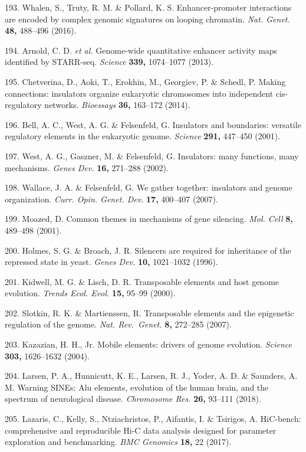 \documentclass[11pt,twoside]{MPIthesis}
\theoremstyle{definition}
\theoremstyle{definition}
\theoremstyle{definition}
\theoremstyle{remark}
\begin{document}
193. Whalen, S., Truty, R. M. \& Pollard, K. S. Enhancer-promoter
interactions are encoded by complex genomic signatures on looping
chromatin. \emph{Nat. Genet.} \textbf{48,} 488--496 (2016).

194. Arnold, C. D. \emph{et al.} Genome-wide quantitative enhancer
activity maps identified by STARR-seq. \emph{Science} \textbf{339,}
1074--1077 (2013).

195. Chetverina, D., Aoki, T., Erokhin, M., Georgiev, P. \& Schedl, P.
Making connections: insulators organize eukaryotic chromosomes into
independent cis-regulatory networks. \emph{Bioessays} \textbf{36,}
163--172 (2014).

196. Bell, A. C., West, A. G. \& Felsenfeld, G. Insulators and
boundaries: versatile regulatory elements in the eukaryotic genome.
\emph{Science} \textbf{291,} 447--450 (2001).

197. West, A. G., Gaszner, M. \& Felsenfeld, G. Insulators: many
functions, many mechanisms. \emph{Genes Dev.} \textbf{16,} 271--288
(2002).

198. Wallace, J. A. \& Felsenfeld, G. We gather together: insulators and
genome organization. \emph{Curr. Opin. Genet. Dev.} \textbf{17,}
400--407 (2007).

199. Moazed, D. Common themes in mechanisms of gene silencing.
\emph{Mol. Cell} \textbf{8,} 489--498 (2001).

200. Holmes, S. G. \& Broach, J. R. Silencers are required for
inheritance of the repressed state in yeast. \emph{Genes Dev.}
\textbf{10,} 1021--1032 (1996).

201. Kidwell, M. G. \& Lisch, D. R. Transposable elements and host
genome evolution. \emph{Trends Ecol. Evol.} \textbf{15,} 95--99 (2000).

202. Slotkin, R. K. \& Martienssen, R. Transposable elements and the
epigenetic regulation of the genome. \emph{Nat. Rev.~Genet.} \textbf{8,}
272--285 (2007).

203. Kazazian, H. H., Jr. Mobile elements: drivers of genome evolution.
\emph{Science} \textbf{303,} 1626--1632 (2004).

204. Larsen, P. A., Hunnicutt, K. E., Larsen, R. J., Yoder, A. D. \&
Saunders, A. M. Warning SINEs: Alu elements, evolution of the human
brain, and the spectrum of neurological disease. \emph{Chromosome Res.}
\textbf{26,} 93--111 (2018).

205. Lazaris, C., Kelly, S., Ntziachristos, P., Aifantis, I. \&
Tsirigos, A. HiC-bench: comprehensive and reproducible Hi-C data
analysis designed for parameter exploration and benchmarking. \emph{BMC
Genomics} \textbf{18,} 22 (2017).
\end{document}
